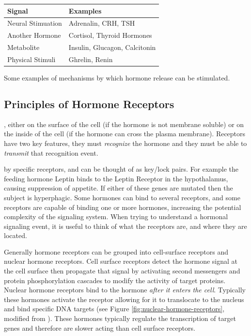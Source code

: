 \documentclass{tufte-handout}
\begin{document}
\begin{margintable}[-1cm]
  \centering
  \begin{tabular}{ll}
    \toprule
    Signal & Examples \\
    \midrule
    Neural Stimuation & Adrenalin, CRH, TSH \\
    Another Hormone & Cortisol, Thyroid Hormones \\
    Metabolite & Insulin, Glucagon, Calcitonin \\
    Physical Stimuli & Ghrelin, Renin \\
    \bottomrule
  \end{tabular}
  \caption{Some examples of mechanisms by which hormone release can be stimulated.}
  \label{tab:secreting-events}
\end{margintable}

\subsection{Principles of Hormone Receptors}

, either on the surface of the cell (if the hormone is not membrane soluble) or on the inside of the cell (if the hormone can cross the plasma membrane).  Receptors have two key features, they must \emph{recognize} the hormone and they must be able to \emph{transmit} that recognition event.

 by specific receptors, and can be thought of as key/lock pairs.  For example the feeding hormone Leptin binds to the Leptin Receptor in the hypothalamus, causing suppression of appetite.  If either of these genes are mutated then the subject is hyperphagic.  Some hormones can bind to several receptors, and some receptors are capable of binding one or more hormones, increasing the potential complexity of the signaling system.  When trying to understand a hormonal signaling event, it is useful to think of what the receptors are, and where they are located.  

Generally hormone receptors can be grouped into cell-surface receptors and nuclear hormone receptors.  Cell surface receptors detect the hormone signal at the cell surface then propagate that signal by activating second messengers and protein phosphorylation cascades to modify the activity of target proteins.  Nuclear hormone receptors bind to the hormone \emph{after it enters the cell}.  Typically these hormones activate the receptor allowing for it to translocate to the nucleus and bind specific DNA targets (see Figure \ref{fig:nuclear-hormone-receptors}, modified from \cite{Chen1999}).  These hormones typically regulate the transcription of target genes and therefore are slower acting than cell surface receptors.
\end{document}
